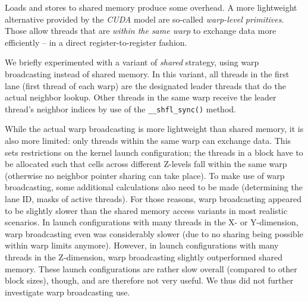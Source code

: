 
Loads and stores to shared memory produce some overhead. A more lightweight alternative provided by the \emph{CUDA} model are so-called \emph{warp-level primitives}. Those allow threads that are \emph{within the same warp} to exchange data more efficiently -- in a direct register-to-register fashion.

We briefly experimented with a variant of \emph{shared} strategy, using warp broadcasting instead of shared memory. In this variant, all threads in the first lane (first thread of each warp) are the designated leader threads that do the actual neighbor lookup. Other threads in the same warp receive the leader thread's neighbor indices by use of the \texttt{\_\_shfl\_sync()} method.

While the actual warp broadcasting is more lightweight than shared memory, it is also more limited: only threads within the same warp can exchange data. This sets restrictions on the kernel launch configuration; the threads in a block have to be allocated such that cells across different Z-levels fall within the same warp (otherwise no neighbor pointer sharing can take place). To make use of warp broadcasting, some additional calculations also need to be made (determining the lane ID, masks of active threads). For those reasons, warp broadcasting appeared to be slightly slower than the shared memory access variants in most realistic scenarios. In launch configurations with many threads in the X- or Y-dimension, warp broadcasting even was considerably slower (due to no sharing being possible within warp limits anymore). However, in launch configurations with many threads in the Z-dimension, warp broadcasting slightly outperformed shared memory. These launch configurations are rather slow overall (compared to other block sizes), though, and are therefore not very useful. We thus did not further investigate warp broadcasting use.

